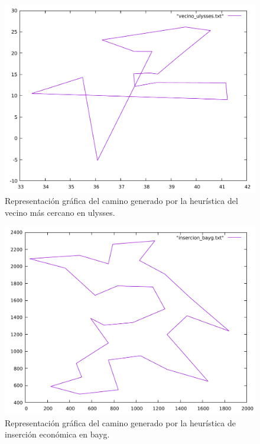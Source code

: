 \begin{figure}[H]
  \centering
  \includegraphics[scale=0.5]{../src/vecino_ulysses.pdf}
  \caption{Representación gráfica del camino generado por la heurística del vecino más cercano en ulysses.}
\end{figure} 

\begin{figure}[H]
  \centering
  \includegraphics[scale=0.5]{../src/insercion_bayg.pdf}
  \caption{Representación gráfica del camino generado por la heurística de inserción económica en bayg.}
\end{figure} 

